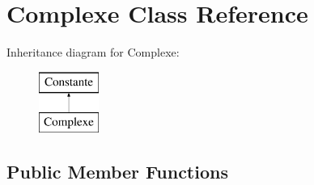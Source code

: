 \hypertarget{class_complexe}{\section{Complexe Class Reference}
\label{class_complexe}
}
Inheritance diagram for Complexe\-:\begin{figure}[H]
\begin{center}
\leavevmode
\includegraphics[height=2.000000cm]{class_complexe}
\end{center}
\end{figure}
\subsection*{Public Member Functions}
